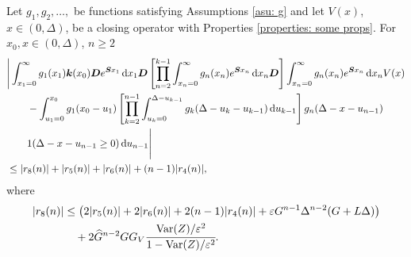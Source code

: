 \begin{cor} \label{cor: aaaaa}
	Let \(g_1,g_2,\dots,\) be functions satisfying Assumptions \ref{asu: g} and let \(V(x)\), \(x\in(0,\Delta)\), be a closing operator with Properties \ref{properties: some props}. For \(x_0,x\in(0,\Delta)\), \(n\geq 2\)
	\begin{align}
		&\Bigg| \int_{x_1=0}^\infty g_1(x_1) \boldsymbol k(x_0) \boldsymbol D e^{\boldsymbol{S}x_1}\, \mathrm{d} x_1\boldsymbol D 
            	\left[\prod_{n=2}^{k-1}\int_{x_n=0}^\infty g_n(x_n) e^{\boldsymbol{S}x_n} \, \mathrm{d} x_n
		\boldsymbol D\right]
            	\int_{x_n=0}^\infty g_{n}(x_n) e^{\boldsymbol{S}x_n} \, \mathrm{d} x_n V(x) \nonumber 
		\\&\qquad {}- \int_{u_1=0}^{x_0}g_1(x_0 - u_1)
		\left[\prod_{k=2}^{n-1} \int_{u_k=0}^{\Delta-u_{k-1}} g_k(\Delta-u_k-u_{k-1})\, \mathrm{d} u_{k-1}\right] \nonumber 
            	g_{n}(\Delta - x-u_{n-1})
	\\&\qquad{} 1(\Delta-x-u_{n-1}\geq0)\, \mathrm{d} u_{n-1} \Bigg| \nonumber
		\\&\leq |r_8(n)|+|r_5(n)|+|r_6(n)| + (n-1)|r_4(n)|,\label{eqn: KAFnn}
	\end{align}
	where 
	\begin{align}
		|r_8(n)|&\leq \left( 2|r_5(n)| + 2|r_6(n)| + 2(n-1)|r_4(n)| + \varepsilon G^{n-1}\Delta^{n-2}(G+L\Delta) \right) \\&\quad{} 
	+2\widehat G^{n-2}GG_V\cfrac{\mathrm{Var}(Z)/\varepsilon^2}{1-\mathrm{Var}(Z)/\varepsilon^2}.
	\end{align}
\end{cor}
